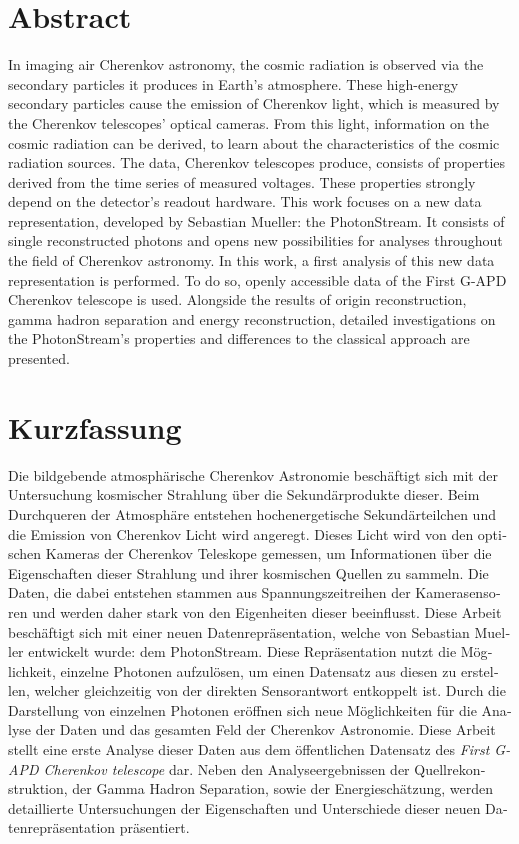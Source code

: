 \section*{\color{tugreen}Abstract}
%
In imaging air Cherenkov astronomy, the cosmic radiation is observed via the
secondary particles it produces in Earth's atmosphere. These high-energy secondary
particles cause the emission of Cherenkov light, which is measured by the
Cherenkov telescopes' optical cameras. From this light, information on the
cosmic radiation can be derived, to learn about the characteristics of the
cosmic radiation sources. The data, Cherenkov telescopes produce, consists of
properties derived from the time series of measured voltages. These properties
strongly depend on the detector's readout hardware. This work focuses on a new
data representation, developed by Sebastian Mueller: the PhotonStream. It
consists of single reconstructed photons and opens new possibilities for
analyses throughout the field of Cherenkov astronomy. In this work, a first analysis of this new data representation is
performed. To do so, openly accessible data of the First G-APD Cherenkov
telescope is used. Alongside the results of origin reconstruction, gamma hadron
separation and energy reconstruction, detailed investigations on the
PhotonStream's properties and differences to the classical approach are
presented.

\section*{\color{tugreen}Kurzfassung}
%
\begin{german}
Die bildgebende atmosphärische Cherenkov Astronomie beschäftigt sich mit der
Untersuchung kosmischer Strahlung über die Sekundärprodukte dieser. Beim
Durchqueren der Atmosphäre entstehen hochenergetische Sekundärteilchen und die
Emission von Cherenkov Licht wird angeregt. Dieses Licht wird von den optischen
Kameras der Cherenkov Teleskope gemessen, um Informationen über die
Eigenschaften dieser Strahlung und ihrer kosmischen Quellen zu sammeln. Die
Daten, die dabei entstehen stammen aus Spannungszeitreihen der Kamerasensoren
und werden daher stark von den Eigenheiten dieser beeinflusst. Diese Arbeit
beschäftigt sich mit einer neuen Datenrepräsentation, welche von Sebastian
Mueller entwickelt wurde: dem PhotonStream. Diese Repräsentation nutzt die
Möglichkeit, einzelne Photonen aufzulösen, um einen Datensatz aus diesen zu
erstellen, welcher gleichzeitig von der direkten Sensorantwort entkoppelt ist.
Durch die Darstellung von einzelnen Photonen eröffnen sich neue Möglichkeiten
für die Analyse der Daten und das gesamten Feld der Cherenkov Astronomie.
Diese Arbeit stellt eine erste Analyse dieser Daten aus dem
öffentlichen Datensatz des \textit{First G-APD Cherenkov telescope} dar. Neben
den Analyseergebnissen der Quellrekonstruktion, der Gamma Hadron Separation,
sowie der Energieschätzung, werden detaillierte Untersuchungen der
Eigenschaften und Unterschiede dieser neuen Datenrepräsentation präsentiert.
\end{german}
